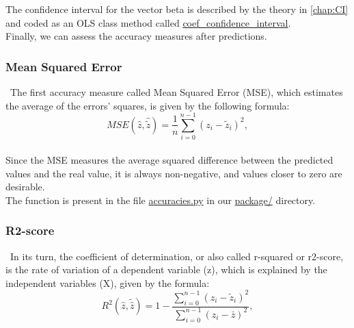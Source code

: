 The confidence interval for the vector beta is described by the theory in \autoref{chap:CI} and coded as an OLS class method called \href{https://github.com/fabiorodp/UiO-FYS-STK4155/tree/master/Project1/package}{coef\_confidence\_interval}.\\

Finally, we can assess the accuracy measures after predictions.\\

\subsubsection{Mean Squared Error}
\label{chap:Mean Squared Error}

\quad \, The first accuracy measure called Mean Squared Error (MSE), which estimates the average of the errors' squares, is given by the following formula:\\

\begin{equation}
\label{MSE-Function}
MSE(\hat{z},\hat{\tilde{z}}) = \frac{1}{n}
\sum_{i=0}^{n-1}(z_i-\tilde{z}_i)^2,
\end{equation}\\

Since the MSE measures the average squared difference between the predicted values and the real value, it is always non-negative, and values closer to zero are desirable.\\

The function is present in the file \href{https://github.com/fabiorodp/UiO-FYS-STK4155/blob/master/Project1/package/accuracies.py}{accuracies.py} in our \href{https://github.com/fabiorodp/UiO-FYS-STK4155/tree/master/Project1/package}{package/} directory.\\

\subsubsection{R2-score}
\label{chap:R2-score}

\quad \, In its turn, the coefficient of determination, or also called r-squared or r2-score, is the rate of variation of a dependent variable (z), which is explained by the independent variables (X), given by the formula:\\

\begin{equation}
\label{R2-Function}
R^2(\hat{z}, \tilde{\hat{z}}) = 1 - \frac{\sum_{i=0}^{n - 1} (z_i - \tilde{z}_i)^2}{\sum_{i=0}^{n - 1} (z_i - \bar{z})^2},
\end{equation}\\

